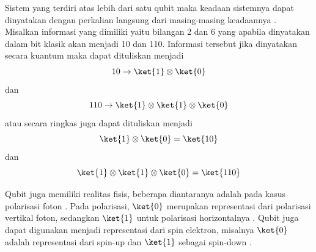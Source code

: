 \par
Sistem yang terdiri atas lebih dari satu qubit maka keadaan sistemnya dapat dinyatakan dengan perkalian langsung dari masing-masing keadaannya \cite{mermin2007quantum, bengtsson2017geometry, barnett2009quantum, schlosshauer2007decoherence}. Misalkan informasi yang dimiliki yaitu bilangan 2 dan 6 yang apabila dinyatakan dalam bit klasik akan menjadi 10 dan 110. Informasi tersebut jika dinyatakan secara kuantum maka dapat dituliskan menjadi
\begin{equation}
10 \rightarrow \ket{1} \otimes \ket{0}
\end{equation}
dan
\begin{equation}
110 \rightarrow \ket{1} \otimes \ket{1} \otimes \ket{0}
\end{equation}
atau secara ringkas juga dapat dituliskan menjadi
\begin{equation}
\ket{1} \otimes \ket{0} = \ket{10}
\end{equation}
dan
\begin{equation}
\ket{1} \otimes \ket{1} \otimes \ket{0} = \ket{110}
\end{equation}
\par

Qubit juga memiliki realitas fisis, beberapa diantaranya adalah pada kasus polarisasi foton \cite{nielsen2010quantum}. Pada polarisasi, $\ket{0}$ merupakan representasi dari polarisasi vertikal foton, sedangkan $\ket{1}$ untuk polarisasi horizontalnya \cite{kok2007linear}. Qubit juga dapat digunakan menjadi representasi dari spin elektron, misalnya $\ket{0}$ adalah representasi dari spin-up dan $\ket{1}$ sebagai spin-down \cite{sakurai2017modern}.

